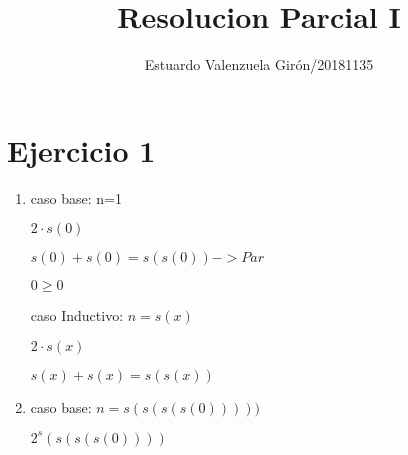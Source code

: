 \documentclass{article}
\author{Estuardo Valenzuela Girón/20181135}
\title{Resolucion Parcial I}
\begin{document}
\maketitle

\section{Ejercicio 1}
\begin{enumerate}
    \item   caso base: n=1\par
    $2 \cdot s(0) $\par
    $s(0) + s(0) = s(s(0)) -> Par$ \par
    $0\geq 0$ \par
    caso Inductivo: $ n=s(x) $ \par
    $2\cdot s(x) $ \par
    $s(x)+s(x)=s(s(x))$ \par
   
    \item caso base: $n=s(s(s(s(0)))))$ \par
    $2^s(s(s(s(0))))$
\end{enumerate}
\end{document}
